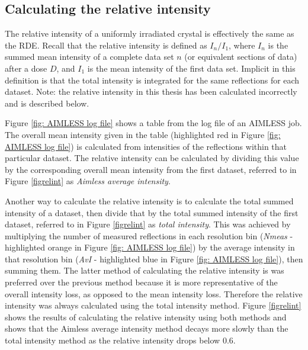 \subsection{Calculating the relative intensity}
\label{sub:Calculating the relative intensity}
The relative intensity of a uniformly irradiated crystal is effectively the same as the RDE.
Recall that the relative intensity is defined as $I_n/I_1$, where $I_n$ is the summed mean intensity of a complete data set $n$ (or equivalent sections of data) after a dose $D$, and $I_1$ is the mean intensity of the first data set.
Implicit in this definition is that the total intensity is integrated for the same reflections for each dataset. Note: the relative intensity in this thesis has been calculated incorrectly and is described below.

Figure \ref{fig: AIMLESS log file} shows a table from the log file of an AIMLESS job.
The overall mean intensity given in the table (highlighted red in Figure \ref{fig: AIMLESS log file}) is calculated from intensities of the reflections within that particular dataset.
The relative intensity can be calculated by dividing this value by the corresponding overall mean intensity from the first dataset, referred to in Figure \ref{figrelint} as \textit{Aimless average intensity}.

Another way to calculate the relative intensity is to calculate the total summed intensity of a dataset, then divide that by the total summed intensity of the first dataset, referred to in Figure \ref{figrelint} as \textit{total intensity}.
This was achieved by multiplying the number of measured reflections in each resolution bin (\textit{Nmeas} - highlighted orange in Figure \ref{fig: AIMLESS log file}) by the average intensity in that resolution bin (\textit{AvI} - highlighted blue in Figure \ref{fig: AIMLESS log file}), then summing them.
The latter method of calculating the relative intensity is was preferred over the previous method because it is more representative of the overall intensity loss, as opposed to the mean intensity loss.
Therefore the relative intensity was always calculated using the total intensity method.
Figure \ref{figrelint} shows the results of calculating the relative intensity using both methods and shows that the Aimless average intensity method decays more slowly than the total intensity method as the relative intensity drops below 0.6.

